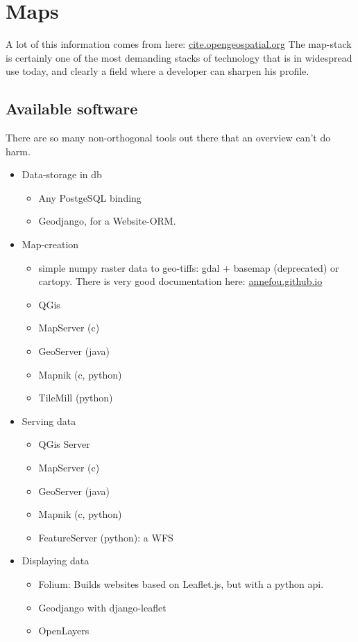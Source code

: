 \section{Maps}

A lot of this information comes from here: \href{http://cite.opengeospatial.org/pub/cite/files/edu/wmts/text/operations.html}{cite.opengeospatial.org}
The map-stack is certainly one of the most demanding stacks of technology that is in widespread use today, and clearly a field where a developer can sharpen his profile.

\subsection{Available software} 
There are so many non-orthogonal tools out there that an overview can't do harm.

\begin{itemize}
    \item Data-storage in db
        \begin{itemize}
            \item Any PostgeSQL binding
            \item Geodjango, for a Website-ORM.
        \end{itemize}
    \item Map-creation
        \begin{itemize}
            \item simple numpy raster data to geo-tiffs: gdal + basemap (deprecated) or cartopy. There is very good documentation here: \href{https://annefou.github.io/metos\_python/04-plotting/}{annefou.github.io}
            \item QGis
            \item MapServer (c)
            \item GeoServer (java)
            \item Mapnik (c, python)
            \item TileMill (python)
        \end{itemize}
    \item Serving data
        \begin{itemize}
	    \item QGis Server
            \item MapServer (c)
            \item GeoServer (java)
            \item Mapnik (c, python)
            \item FeatureServer (python): a WFS 
        \end{itemize}
    \item Displaying data
        \begin{itemize}
            \item Folium: Builds websites based on Leaflet.js, but with a python api.
            \item Geodjango with django-leaflet
            \item OpenLayers
        \end{itemize}
\end{itemize}




